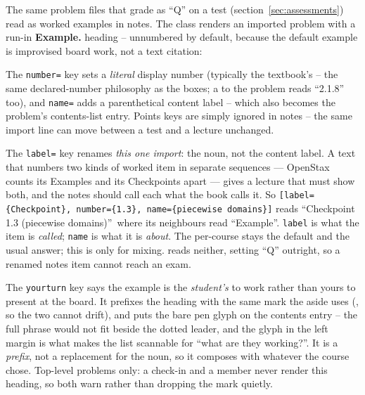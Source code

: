The same problem files that grade as ``Q'' on a test
(section~\ref{sec:assessments}) read as worked examples in notes. The class
renders an imported problem with a run-in \textbf{Example.} heading --
unnumbered by default, because the default example is improvised board work,
not a text citation:

\begin{manexsource}


\end{manexsource}

The \texttt{number=} key sets a \emph{literal} display number (typically the
textbook's -- the same declared-number philosophy as the boxes; a  to
the problem reads ``2.1.8'' too), and \texttt{name=} adds a parenthetical
content label -- which also becomes the problem's contents-list entry. Points keys are simply ignored in notes -- the same import line can
move between a test and a lecture unchanged.

The \texttt{label=} key renames \emph{this one import}: the noun, not the
content label. A text that numbers two kinds of worked item in separate
sequences --- OpenStax counts its Examples and its Checkpoints apart --- gives a
lecture that must show both, and the notes should call each what the book calls
it. So \texttt{[label=\{Checkpoint\}, number=\{1.3\}, name=\{piecewise
domains\}]} reads ``Checkpoint 1.3 (piecewise domains)''\ where its neighbours
read ``Example''. \texttt{label} is what the item is \emph{called};
\texttt{name} is what it is \emph{about}. The per-course
 stays the default and the usual answer; this is only
for mixing.  reads neither, setting ``Q'' outright, so a renamed
notes item cannot reach an exam.

The \texttt{yourturn} key says the example is the \emph{student's} to work
rather than yours to present at the board. It prefixes the heading with the
same mark the  aside uses (, so the two cannot
drift), and puts the bare pen glyph on the contents entry -- the full phrase
would not fit beside the dotted leader, and the glyph in the left margin is
what makes the list scannable for ``what are they working?''. It is a
\emph{prefix}, not a replacement for the noun, so it composes with whatever
 the course chose. Top-level problems only: a
check-in and a  member never render this heading, so both
warn rather than dropping the mark quietly.

